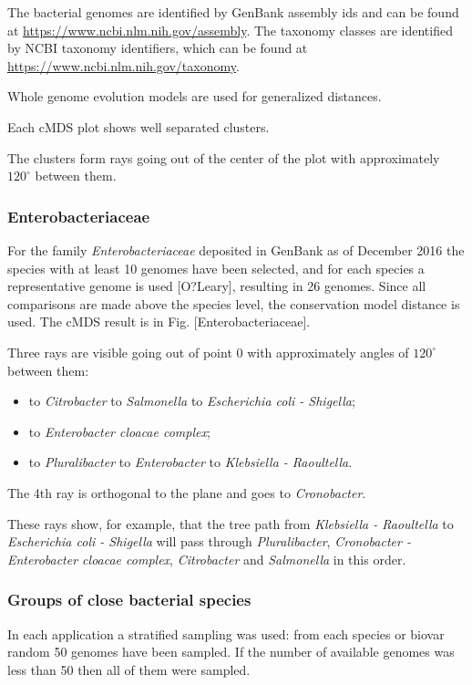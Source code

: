 \documentclass[10pt,a4paper]{article}
\begin{document}
The bacterial genomes are identified by GenBank assembly ids and can be found at \url{https://www.ncbi.nlm.nih.gov/assembly}. 
The taxonomy classes are identified by NCBI taxonomy identifiers, which can be found at \url{https://www.ncbi.nlm.nih.gov/taxonomy}.

Whole genome evolution models are used for generalized distances. 

Each cMDS plot shows well separated clusters. 

The clusters form rays going out of the center of the plot with approximately $120^\circ$ between them.


\subsubsection{Enterobacteriaceae}

For the family {\it Enterobacteriaceae} deposited in GenBank as of December 2016 
the species with at least 10 genomes have been selected, 
and for each species a representative genome is used [O?Leary], resulting in 26 genomes. 
Since all comparisons are made above the species level, the conservation model distance is used. 
The cMDS result is in Fig. [Enterobacteriaceae]. 

Three rays are visible going out of point 0 with approximately angles of $120^\circ$ between them:
\begin{itemize}
\item to {\it Citrobacter} to {\it Salmonella} to {\it  Escherichia coli - Shigella};
\item to {\it Enterobacter cloacae complex};
\item to {\it Pluralibacter} to {\it Enterobacter} to {\it Klebsiella - Raoultella}.
\end{itemize}

The 4th ray is orthogonal to the plane and goes to {\it Cronobacter}.

These rays show, for example, that the tree path from {\it Klebsiella - Raoultella} to {\it Escherichia coli - Shigella} will pass through {\it Pluralibacter}, {\it Cronobacter - Enterobacter cloacae complex}, 
{\it Citrobacter} and {\it Salmonella} in this order.


\subsubsection{Groups of close bacterial species}

In each application a stratified sampling was used: from each species or biovar random 50 genomes have been sampled. 
If the number of available genomes was less than 50 then all of them were sampled.
\end{document}

